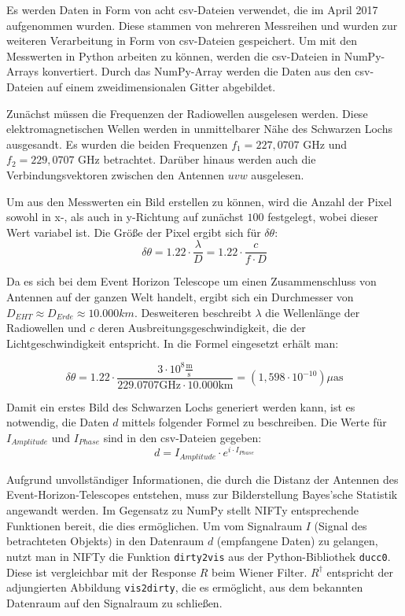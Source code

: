 Es werden Daten in Form von acht csv-Dateien verwendet, die im April 2017 aufgenommen wurden. Diese stammen von mehreren Messreihen und wurden zur weiteren Verarbeitung in Form von csv-Dateien gespeichert.
Um mit den Messwerten in Python arbeiten zu können, werden die csv-Dateien in NumPy-Arrays konvertiert. Durch das NumPy-Array werden die Daten aus den csv-Dateien auf einem zweidimensionalen Gitter abgebildet.

Zunächst müssen die Frequenzen der Radiowellen ausgelesen werden. Diese elektromagnetischen Wellen werden in unmittelbarer Nähe des Schwarzen Lochs ausgesandt. Es wurden die beiden Frequenzen $f_1 = 227,0707$ GHz und $f_2 = 229,0707$ GHz betrachtet. Darüber hinaus werden auch die Verbindungsvektoren zwischen den Antennen $uvw$ ausgelesen.

Um aus den Messwerten ein Bild erstellen zu können, wird die Anzahl der Pixel sowohl in x-, als auch in y-Richtung auf zunächst $100$ festgelegt, wobei dieser Wert variabel ist. Die Größe der Pixel ergibt sich für $\delta \theta$:
\[ \delta \theta = 1.22 \cdot \displaystyle\frac{\lambda}{D} = 1.22 \cdot \displaystyle\frac{c}{f \cdot D} \]

Da es sich bei dem Event Horizon Telescope um einen Zusammenschluss von Antennen auf der ganzen Welt handelt, ergibt sich ein Durchmesser von $D_{EHT} \approx D_{Erde} \approx 10.000km$. Desweiteren beschreibt $\lambda$ die Wellenlänge der Radiowellen und $c$ deren Ausbreitungsgeschwindigkeit, die der Lichtgeschwindigkeit entspricht. In die Formel eingesetzt erhält man:

\begin{equation}
  \delta \theta = 1.22 \cdot \displaystyle\frac{3 \cdot 10^{8} \displaystyle\frac{\text{m}}{\text{s}}} {229.0707 \text{GHz} \cdot 10.000 \text{km}} = (1,598 \cdot 10^{-10}) \mu \text{as} 
\end{equation}

Damit ein erstes Bild des Schwarzen Lochs generiert werden kann, ist es notwendig, die Daten $d$ mittels folgender Formel zu beschreiben. Die Werte für $I_{Amplitude}$ und $I_{Phase}$ sind in den csv-Dateien gegeben:
\[ d = I_{Amplitude} \cdot e^{i \cdot I_{Phase}} \]

Aufgrund unvollständiger Informationen, die durch die Distanz der Antennen des Event-Horizon-Telescopes entstehen, muss zur Bilderstellung Bayes'sche Statistik angewandt werden. Im Gegensatz zu NumPy stellt NIFTy entsprechende Funktionen bereit, die dies ermöglichen. Um vom Signalraum $I$ (Signal des betrachteten Objekts) in den Datenraum $d$ (empfangene Daten) zu gelangen, nutzt man in NIFTy die Funktion \verb|dirty2vis| aus der Python-Bibliothek \verb|ducc0|. Diese ist vergleichbar mit der Response $R$ beim Wiener Filter. $R^{\dagger}$ entspricht der adjungierten Abbildung \verb|vis2dirty|, die es ermöglicht, aus dem bekannten Datenraum auf den Signalraum zu schließen.

